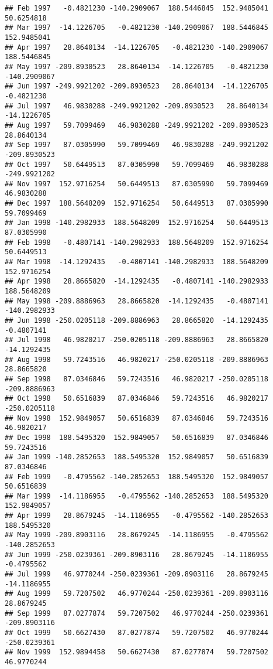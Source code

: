 \documentclass[]{article}
\begin{document}
\begin{verbatim}
## Feb 1997   -0.4821230 -140.2909067  188.5446845  152.9485041   50.6254818
## Mar 1997  -14.1226705   -0.4821230 -140.2909067  188.5446845  152.9485041
## Apr 1997   28.8640134  -14.1226705   -0.4821230 -140.2909067  188.5446845
## May 1997 -209.8930523   28.8640134  -14.1226705   -0.4821230 -140.2909067
## Jun 1997 -249.9921202 -209.8930523   28.8640134  -14.1226705   -0.4821230
## Jul 1997   46.9830288 -249.9921202 -209.8930523   28.8640134  -14.1226705
## Aug 1997   59.7099469   46.9830288 -249.9921202 -209.8930523   28.8640134
## Sep 1997   87.0305990   59.7099469   46.9830288 -249.9921202 -209.8930523
## Oct 1997   50.6449513   87.0305990   59.7099469   46.9830288 -249.9921202
## Nov 1997  152.9716254   50.6449513   87.0305990   59.7099469   46.9830288
## Dec 1997  188.5648209  152.9716254   50.6449513   87.0305990   59.7099469
## Jan 1998 -140.2982933  188.5648209  152.9716254   50.6449513   87.0305990
## Feb 1998   -0.4807141 -140.2982933  188.5648209  152.9716254   50.6449513
## Mar 1998  -14.1292435   -0.4807141 -140.2982933  188.5648209  152.9716254
## Apr 1998   28.8665820  -14.1292435   -0.4807141 -140.2982933  188.5648209
## May 1998 -209.8886963   28.8665820  -14.1292435   -0.4807141 -140.2982933
## Jun 1998 -250.0205118 -209.8886963   28.8665820  -14.1292435   -0.4807141
## Jul 1998   46.9820217 -250.0205118 -209.8886963   28.8665820  -14.1292435
## Aug 1998   59.7243516   46.9820217 -250.0205118 -209.8886963   28.8665820
## Sep 1998   87.0346846   59.7243516   46.9820217 -250.0205118 -209.8886963
## Oct 1998   50.6516839   87.0346846   59.7243516   46.9820217 -250.0205118
## Nov 1998  152.9849057   50.6516839   87.0346846   59.7243516   46.9820217
## Dec 1998  188.5495320  152.9849057   50.6516839   87.0346846   59.7243516
## Jan 1999 -140.2852653  188.5495320  152.9849057   50.6516839   87.0346846
## Feb 1999   -0.4795562 -140.2852653  188.5495320  152.9849057   50.6516839
## Mar 1999  -14.1186955   -0.4795562 -140.2852653  188.5495320  152.9849057
## Apr 1999   28.8679245  -14.1186955   -0.4795562 -140.2852653  188.5495320
## May 1999 -209.8903116   28.8679245  -14.1186955   -0.4795562 -140.2852653
## Jun 1999 -250.0239361 -209.8903116   28.8679245  -14.1186955   -0.4795562
## Jul 1999   46.9770244 -250.0239361 -209.8903116   28.8679245  -14.1186955
## Aug 1999   59.7207502   46.9770244 -250.0239361 -209.8903116   28.8679245
## Sep 1999   87.0277874   59.7207502   46.9770244 -250.0239361 -209.8903116
## Oct 1999   50.6627430   87.0277874   59.7207502   46.9770244 -250.0239361
## Nov 1999  152.9894458   50.6627430   87.0277874   59.7207502   46.9770244

\end{verbatim}
\end{document}
